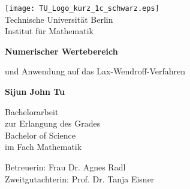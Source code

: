 \begin{titlepage}
	\begin{center}
		\vspace*{1cm}
		\texttt{[image: TU\_Logo\_kurz\_1c\_schwarz.eps]}\\
		\Large
		Technische Universität Berlin\\
		Institut für Mathematik
		\vspace*{1cm}



		\Huge
		\textbf{Numerischer Wertebereich}
		
		\vspace{0.5cm}
		\LARGE
		und Anwendung auf das Lax-Wendroff-Verfahren
		
		\vspace{1.5cm}
		
		\textbf{Sijun John Tu}
		
		\vfill
		
		Bachelorarbeit \\
		zur Erlangung des Grades\\
		Bachelor of Science \\
		im Fach Mathematik
		
		\vspace{0.8cm}

		
		
		Betreuerin: Frau Dr. Agnes Radl\\
		Zweitgutachterin: Prof. Dr. Tanja Eisner \\
		
	\end{center}
\end{titlepage}